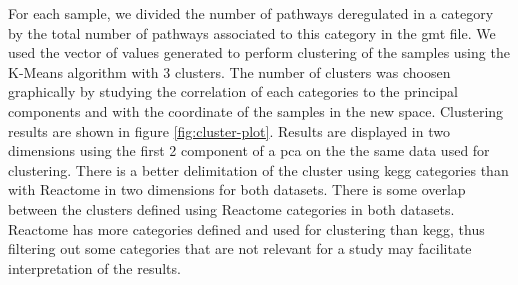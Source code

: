 For each sample, we divided the number of pathways deregulated in a category by the total number of pathways associated to this category in the \acrshort{gmt} file.
We used the vector of values generated to perform clustering of the samples using the K-Means algorithm with 3 clusters.
The number of clusters was choosen graphically by studying the correlation of each categories to the principal components and with the coordinate of the samples in the new space.
Clustering results are shown in figure \ref*{fig:cluster-plot}.
Results are displayed in two dimensions using the first 2 component of a \acrshort{pca} on the the same data used for clustering.
There is a better delimitation of the cluster using \acrshort{kegg} categories than with Reactome in two dimensions for both datasets.
There is some overlap between the clusters defined using Reactome categories in both datasets.
Reactome has more categories defined and used for clustering than \acrshort{kegg}, thus filtering out some categories that are not relevant for a study may facilitate interpretation of the results.

